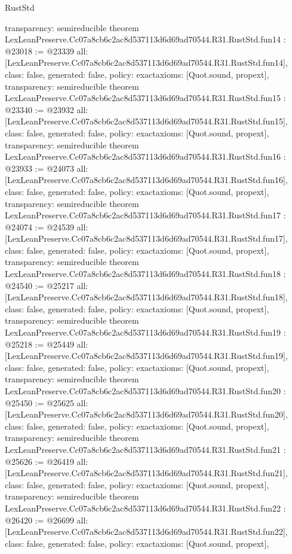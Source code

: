 \begin{lexlean}{RustStd}
\begin{coremodule}
{  transparency: semireducible
}
theorem LexLeanPreserve.Cc07a8cb6c2ac8d537113d6d69ad70544.R31.RustStd.fun14 : @23018 := @23339 {
  all: [LexLeanPreserve.Cc07a8cb6c2ac8d537113d6d69ad70544.R31.RustStd.fun14],
  class: false,
  generated: false,
  policy: exact{axioms: [Quot.sound, propext]},
  transparency: semireducible
}
theorem LexLeanPreserve.Cc07a8cb6c2ac8d537113d6d69ad70544.R31.RustStd.fun15 : @23340 := @23932 {
  all: [LexLeanPreserve.Cc07a8cb6c2ac8d537113d6d69ad70544.R31.RustStd.fun15],
  class: false,
  generated: false,
  policy: exact{axioms: [Quot.sound, propext]},
  transparency: semireducible
}
theorem LexLeanPreserve.Cc07a8cb6c2ac8d537113d6d69ad70544.R31.RustStd.fun16 : @23933 := @24073 {
  all: [LexLeanPreserve.Cc07a8cb6c2ac8d537113d6d69ad70544.R31.RustStd.fun16],
  class: false,
  generated: false,
  policy: exact{axioms: [Quot.sound, propext]},
  transparency: semireducible
}
theorem LexLeanPreserve.Cc07a8cb6c2ac8d537113d6d69ad70544.R31.RustStd.fun17 : @24074 := @24539 {
  all: [LexLeanPreserve.Cc07a8cb6c2ac8d537113d6d69ad70544.R31.RustStd.fun17],
  class: false,
  generated: false,
  policy: exact{axioms: [Quot.sound, propext]},
  transparency: semireducible
}
theorem LexLeanPreserve.Cc07a8cb6c2ac8d537113d6d69ad70544.R31.RustStd.fun18 : @24540 := @25217 {
  all: [LexLeanPreserve.Cc07a8cb6c2ac8d537113d6d69ad70544.R31.RustStd.fun18],
  class: false,
  generated: false,
  policy: exact{axioms: [Quot.sound, propext]},
  transparency: semireducible
}
theorem LexLeanPreserve.Cc07a8cb6c2ac8d537113d6d69ad70544.R31.RustStd.fun19 : @25218 := @25449 {
  all: [LexLeanPreserve.Cc07a8cb6c2ac8d537113d6d69ad70544.R31.RustStd.fun19],
  class: false,
  generated: false,
  policy: exact{axioms: [Quot.sound, propext]},
  transparency: semireducible
}
theorem LexLeanPreserve.Cc07a8cb6c2ac8d537113d6d69ad70544.R31.RustStd.fun20 : @25450 := @25625 {
  all: [LexLeanPreserve.Cc07a8cb6c2ac8d537113d6d69ad70544.R31.RustStd.fun20],
  class: false,
  generated: false,
  policy: exact{axioms: [Quot.sound, propext]},
  transparency: semireducible
}
theorem LexLeanPreserve.Cc07a8cb6c2ac8d537113d6d69ad70544.R31.RustStd.fun21 : @25626 := @26419 {
  all: [LexLeanPreserve.Cc07a8cb6c2ac8d537113d6d69ad70544.R31.RustStd.fun21],
  class: false,
  generated: false,
  policy: exact{axioms: [Quot.sound, propext]},
  transparency: semireducible
}
theorem LexLeanPreserve.Cc07a8cb6c2ac8d537113d6d69ad70544.R31.RustStd.fun22 : @26420 := @26699 {
  all: [LexLeanPreserve.Cc07a8cb6c2ac8d537113d6d69ad70544.R31.RustStd.fun22],
  class: false,
  generated: false,
  policy: exact{axioms: [Quot.sound, propext]},
}
\end{coremodule}
\end{lexlean}
